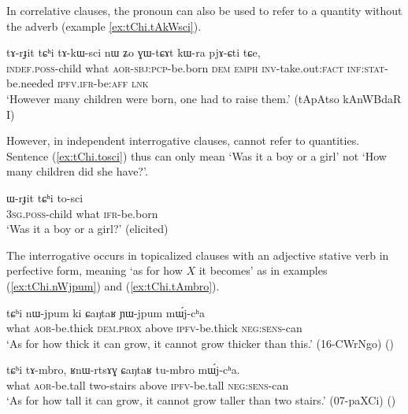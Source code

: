 In correlative clauses, the pronoun  can also be used to refer to a quantity without the adverb  (example \ref{ex:tChi.tAkWsci}).

\begin{exe}
\ex \label{ex:tChi.tAkWsci}
\gll  tɤ-rɟit tɕʰi tɤ-kɯ-sci nɯ ʑo ɣɯ-tɕɤt kɯ-ra pjɤ-ɕti tɕe,   \\
\textsc{indef}.\textsc{poss}-child what \textsc{aor}-\textsc{sbj}:\textsc{pcp}-be.born \textsc{dem} \textsc{emph} \textsc{inv}-take.out:\textsc{fact} \textsc{inf}:\textsc{stat}-be.needed \textsc{ipfv}.\textsc{ifr}-be:\textsc{aff} \textsc{lnk} \\
\glt `However many children were born, one had to raise them.' (tApAtso kAnWBdaR I)
\end{exe}  

However, in independent interrogative clauses,  cannot refer to quantities. Sentence (\ref{ex:tChi.tosci}) thus can only mean `Was it a boy or a girl' not `How many children did she have?'.

\begin{exe}
\ex \label{ex:tChi.tosci}
\gll  ɯ-rɟit tɕʰi to-sci \\
\textsc{3sg}.\textsc{poss}-child what \textsc{ifr}-be.born \\
\glt `Was it a boy or a girl?' (elicited)
\end{exe}  


The interrogative  occurs in topicalized clauses with an adjective stative verb in perfective form, meaning `as for how $X$ it becomes' as in examples (\ref{ex:tChi.nWjpum}) and (\ref{ex:tChi.tAmbro}).

\begin{exe}
\ex \label{ex:tChi.nWjpum}
\gll tɕʰi nɯ-jpum ki ɕaŋtaʁ ɲɯ-jpum mɯ́j-cʰa \\
what \textsc{aor}-be.thick \textsc{dem}.\textsc{prox} above \textsc{ipfv}-be.thick \textsc{neg}:\textsc{sens}-can \\
\glt `As for how thick it can grow, it cannot grow thicker than this.' (16-CWrNgo)
()
\end{exe}


\begin{exe}
\ex \label{ex:tChi.tAmbro}
\gll tɕʰi tɤ-mbro, ʁnɯ-rtsɤɣ ɕaŋtaʁ tu-mbro mɯ́j-cʰa.  \\
what \textsc{aor}-be.tall two-stairs above \textsc{ipfv}-be.tall \textsc{neg}:\textsc{sens}-can \\
\glt `As for how tall it can grow, it cannot grow taller than two stairs.' (07-paXCi)
()
\end{exe}

